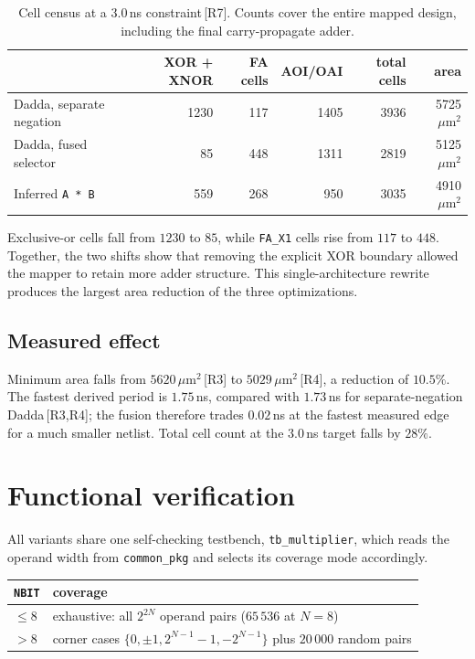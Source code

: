 \documentclass[11pt,a4paper]{article}
\newcommand{\umarea}{\ensuremath{\,\mu\mathrm{m}^{2}}}
\newcommand{\src}[1]{\,{\footnotesize\color{accent}[#1]}}
\begin{document}
\begin{table}[!ht]
\centering\small
\begin{tabular}{@{}lrrrrr@{}}
\toprule
& \textbf{XOR + XNOR} & \textbf{FA cells} & \textbf{AOI/OAI} & \textbf{total cells} & \textbf{area} \\
\midrule
Dadda, separate negation & 1230 & 117 & 1405 & 3936 & 5725\umarea \\
Dadda, fused selector    &   85 & 448 & 1311 & 2819 & 5125\umarea \\
Inferred \texttt{A * B}  &  559 & 268 &  950 & 3035 & 4910\umarea \\
\bottomrule
\end{tabular}
\caption{Cell census at a $3.0$\,ns constraint\src{R7}. Counts cover the entire
mapped design, including the final carry-propagate adder.}
\label{tab:census3}
\end{table}

Exclusive-or cells fall from $1230$ to $85$, while \texttt{FA\_X1} cells rise
from $117$ to $448$. Together, the two shifts show that removing the explicit
XOR boundary allowed the mapper to retain more adder structure. This
single-architecture rewrite produces the largest area reduction of the three
optimizations.

\subsection{Measured effect}

Minimum area falls from $5620\umarea$\src{R3} to
$5029\umarea$\src{R4}, a reduction of $10.5\%$. The fastest derived period is
$1.75$\,ns, compared with $1.73$\,ns for separate-negation Dadda\src{R3,R4};
the fusion therefore trades $0.02$\,ns at the fastest measured edge for a much
smaller netlist. Total cell count at the $3.0$\,ns target falls by $28\%$.

\section{Functional verification}
\label{sec:verif}

All variants share one self-checking testbench, \texttt{tb\_multiplier}, which
reads the operand width from \texttt{common\_pkg} and selects its coverage mode
accordingly.

\begin{table}[!ht]
\centering\small
\begin{tabular}{@{}ll@{}}
\toprule
\texttt{NBIT} & coverage \\
\midrule
$\leq 8$ & exhaustive: all $2^{2N}$ operand pairs ($65\,536$ at $N=8$) \\
$> 8$    & corner cases $\{0, \pm1, 2^{N-1}-1, -2^{N-1}\}$ plus $20\,000$ random pairs \\
\bottomrule
\end{tabular}
\end{table}
\end{document}
